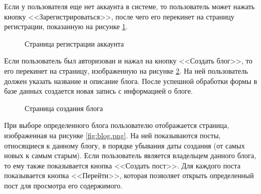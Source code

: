 \documentclass[a4paper, 14pt]{extarticle}
\begin{document}
Если у пользователя еще нет аккаунта в системе, то пользователь может нажать
кнопку <<Зарегистрироваться>>, после чего его перекинет на страницу регистрации,
показанную на рисунке \ref{fig:register.png}.

\begin{figure}[H]
  \centering
  \caption{Страница регистрации аккаунта}
  \label{fig:register.png}
\end{figure}

Если пользователь был авторизован и нажал на кнопку <<Создать блог>>, то его
перекинет на страницу, изображенную на рисунке \ref{fig:create-blog.png}. На ней
пользователь должен указать название и описание блога. После успешной обработки
формы в базе данных создается новая запись с информацией о блоге.

\begin{figure}[H]
  \centering
  \caption{Страница создания блога}
  \label{fig:create-blog.png}
\end{figure}

При выборе определенного блога пользователю отображается страница, изображенная
на рисунке \ref{fig:blog.png}. На ней показываются посты, относящиеся к данному
блогу, в порядке убывания даты создания (от самых новых к самым старым). Если
пользователь является владельцем данного блога, то ему также показывается кнопка
<<Создать пост>>. Для каждого поста показывается кнопка <<Перейти>>, которая
позволяет открыть определенный пост для просмотра его содержимого.
\end{document}

